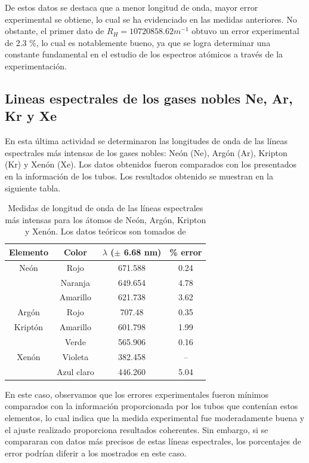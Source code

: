 \documentclass[%
 reprint,
 amsmath,amssymb,
 aps,
]{revtex4-1}
\begin{document}
De estos datos se destaca que a menor longitud de onda, mayor error experimental se obtiene, lo cual se ha evidenciado en las medidas anteriores. No obstante, el primer dato de $R_H = 10720858.62 m^{-1}$ obtuvo un error experimental de 2.3 \%, lo cual es notablemente bueno, ya que se logra determinar una constante fundamental en el estudio de los espectros atómicos a través de la experimentación.

\subsection{Lineas espectrales de los gases nobles Ne, Ar, Kr y Xe}

En esta última actividad se determinaron las longitudes de onda de las líneas espectrales más intensas de los gases nobles: Neón (Ne), Argón (Ar), Kripton (Kr) y Xenón (Xe). Los datos obtenidos fueron comparados con los presentados en la información de los tubos. Los resultados obtenido se muestran en la siguiente tabla.

\begin{table}[H]
    \centering
    \begin{tabular}{|c|c|c|c|}
    \hline
    Elemento & Color & $\lambda$ ($\pm$ 6.68 nm) & \% error \\ \hline
    Neón & Rojo & 671.588 & 0.24  \\
     & Naranja & 649.654 & 4.78 \\
     & Amarillo & 621.738 & 3.62 \\ \hline
    Argón & Rojo & 707.48 & 0.35 \\\hline
    Kriptón & Amarillo & 601.798 & 1.99 \\
     & Verde & 565.906 & 0.16 \\ \hline
     Xenón & Violeta & 382.458 & -- \\
     & Azul claro & 446.260 & 5.04 \\ \hline
    \end{tabular}
    \caption{Medidas de longitud de onda de las líneas espectrales más intensas para los átomos de Neón, Argón, Kripton y Xenón. Los datos teóricos son tomados de \cite{nobles}}
    \label{tab:nobles}
\end{table}

En este caso, observamos que los errores experimentales fueron mínimos comparados con la información proporcionada por los tubos que contenían estos elementos, lo cual indica que la medida experimental fue moderadamente buena y el ajuste realizado proporciona resultados coherentes. Sin embargo, si se compararan con datos más precisos de estas líneas espectrales, los porcentajes de error podrían diferir a los mostrados en este caso.
\end{document}
